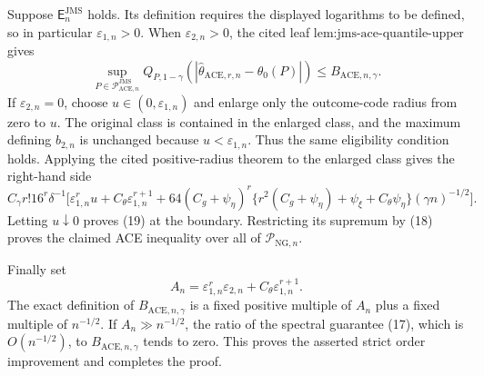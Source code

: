 Suppose \(\mathsf E_n^{\mathrm{JMS}}\) holds.  Its definition requires
the displayed logarithms to be defined, so in particular
\(\varepsilon_{1,n}>0\).  When \(\varepsilon_{2,n}>0\), the cited leaf
\(\text{lem:jms-ace-quantile-upper}\) gives
\[
 \sup_{P\in\mathcal P_{\mathrm{ACE},n}^{\mathrm{JMS}}}
 Q_{P,1-\gamma}
 \!\left(|\widehat\theta_{\mathrm{ACE},r,n}-\theta_0(P)|\right)
 \le B_{\mathrm{ACE},n,\gamma}.                         \tag{19}
\]
If \(\varepsilon_{2,n}=0\), choose
\(u\in(0,\varepsilon_{1,n})\) and enlarge only the outcome-code radius
from zero to \(u\).  The original class is contained in the enlarged
class, and the maximum defining \(b_{2,n}\) is unchanged because
\(u<\varepsilon_{1,n}\).  Thus the same eligibility condition holds.
Applying the cited positive-radius theorem to the enlarged class gives
the right-hand side
\[
 C_{\gamma}r!16^r\delta^{-1}
 \Big[\varepsilon_{1,n}^r u+C_{\theta}\varepsilon_{1,n}^{r+1}
 +64(C_g+\psi_{\eta})^r
 \{r^2(C_g+\psi_{\eta})+\psi_{\xi}+C_{\theta}\psi_{\eta}\}
 (\gamma n)^{-1/2}\Big].
\]
Letting \(u\downarrow0\) proves (19) at the boundary.  Restricting its
supremum by (18) proves the claimed ACE inequality over all of
\(\mathcal P_{\mathrm{NG},n}\).

Finally set
\[
 A_n=\varepsilon_{1,n}^r\varepsilon_{2,n}
     +C_{\theta}\varepsilon_{1,n}^{r+1}.
\]
The exact definition of \(B_{\mathrm{ACE},n,\gamma}\) is a fixed positive
multiple of \(A_n\) plus a fixed multiple of \(n^{-1/2}\).  If
\(A_n\gg n^{-1/2}\), the ratio of the spectral guarantee (17), which is
\(O(n^{-1/2})\), to \(B_{\mathrm{ACE},n,\gamma}\) tends to zero.  This
proves the asserted strict order improvement and completes the proof.